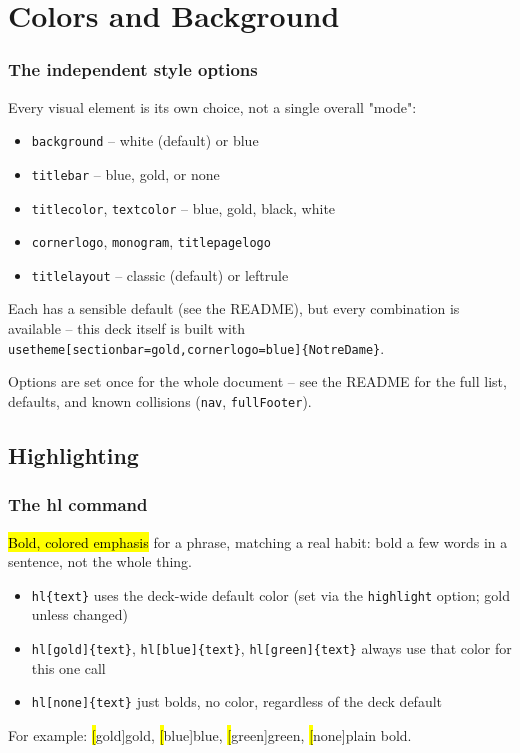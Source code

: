 
\section{Colors and Background}

\begin{frame}[fragile]
\frametitle{The independent style options}
Every visual element is its own choice, not a single overall "mode":
\begin{itemize}
  \item \texttt{background} -- white (default) or blue
  \item \texttt{titlebar} -- blue, gold, or none
  \item \texttt{titlecolor}, \texttt{textcolor} -- blue, gold, black, white
  \item \texttt{cornerlogo}, \texttt{monogram}, \texttt{titlepagelogo}
  \item \texttt{titlelayout} -- classic (default) or leftrule
\end{itemize}
Each has a sensible default (see the README), but every combination is
available -- this deck itself is built with\\
\texttt{\bs usetheme[sectionbar=gold,cornerlogo=blue]\{NotreDame\}}.

\vspace{0.5em}
\scriptsize Options are set once for the whole document -- see the
README for the full list, defaults, and known collisions
(\texttt{nav}, \texttt{fullFooter}).
\end{frame}

\subsection{Highlighting}

\begin{frame}[fragile]
\frametitle{The \bs hl command}
\hl{Bold, colored emphasis} for a phrase, matching a real habit: bold
a few words in a sentence, not the whole thing.
\begin{itemize}
  \item \texttt{\bs hl\{text\}} uses the deck-wide default color (set
    via the \texttt{highlight} option; gold unless changed)
  \item \texttt{\bs hl[gold]\{text\}}, \texttt{\bs hl[blue]\{text\}},
    \texttt{\bs hl[green]\{text\}} always use that color for this one
    call
  \item \texttt{\bs hl[none]\{text\}} just bolds, no color, regardless
    of the deck default
\end{itemize}
For example: \hl[gold]{gold}, \hl[blue]{blue}, \hl[green]{green},
\hl[none]{plain bold}.
\end{frame}

